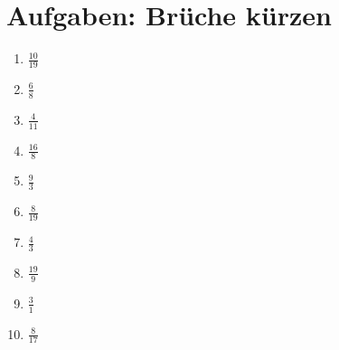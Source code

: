 \documentclass[%
    11pt,paper=a4,fleqn,parskip=half%
]{scrartcl}
\begin{document}
\section*{Aufgaben: Brüche kürzen}
\begin{enumerate} 
    \item $ \frac{10}{19} $ \vspace{1em} 
    \item $ \frac{6}{8} $ \vspace{1em} 
    \item $ \frac{4}{11} $ \vspace{1em} 
    \item $ \frac{16}{8} $ \vspace{1em} 
    \item $ \frac{9}{3} $ \vspace{1em} 
    \item $ \frac{8}{19} $ \vspace{1em} 
    \item $ \frac{4}{3} $ \vspace{1em} 
    \item $ \frac{19}{9} $ \vspace{1em} 
    \item $ \frac{3}{1} $ \vspace{1em} 
    \item $ \frac{8}{17} $ \vspace{1em} 

\end{enumerate} 
%    
\end{document}

